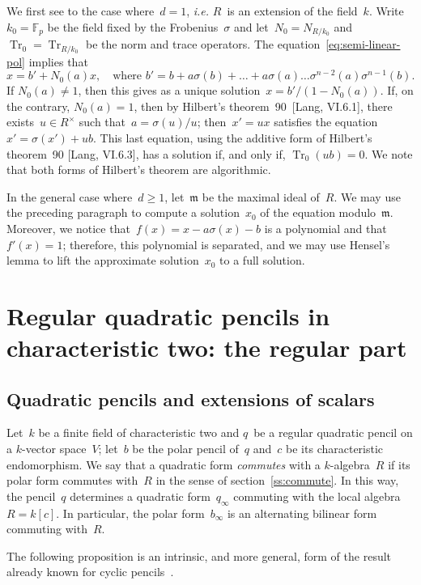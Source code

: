 \documentclass{article}%
\let\fr\mathfrak
\DeclareMathOperator\Tr{Tr}
\def\F{\mathbb{F}}
\begin{document}
We first see to the case where~$d = 1$, \emph{i.e.} $R$~is an extension
of the field~$k$. Write~$k_0 = \F_p$ be the field fixed by the
Frobenius~$σ$ and let~$N_0 = N_{R/k_0}$ and~$\Tr_0 = \Tr_{R/k_0}$ be the
norm and trace operators. The equation~\eqref{eq:semi-linear-pol} implies
that
\begin{equation}
x = b' + N_0(a) x, \quad\text{where $b' = b + a σ(b) + … + a σ(a) …
σ^{n-2}(a) σ^{n-1}(b)$.}
\end{equation}
If $N_0(a) ≠ 1$, then this gives as a unique solution~$x =
b'/(1-N_0(a))$. If, on the contrary, $N_0(a) = 1$, then by
Hilbert's theorem~90~[Lang, VI.6.1], there exists~$u ∈ R^{×}$ such
that~$a = σ(u)/u$; then~$x' = ux$ satisfies the equation~$x' = σ(x') +
ub$. This last equation, using the additive form of Hilbert's theorem~90
[Lang, VI.6.3], has a solution if, and only if, $\Tr_0 (ub) = 0$. We
note that both forms of Hilbert's theorem are algorithmic.

In the general case where~$d ≥ 1$, let~$\fr m$ be the maximal ideal
of~$R$. We may use the preceding paragraph to compute a solution~$x_0$ of
the equation modulo~$\fr m$. Moreover, we notice that~$f(x) = x -  a σ(x)
- b$ is a polynomial and that~$f'(x) = 1$; therefore, this polynomial is
separated, and we may use Hensel's lemma to lift the approximate
solution~$x_0$ to a full solution.

\section{Regular quadratic pencils in characteristic two: the regular part}%
\label{S:quad-reg}
\subsection{Quadratic pencils and extensions of scalars}%
Let~$k$ be a finite field of characteristic two and $q$~be a regular
quadratic pencil on a $k$-vector space~$V$;
let~$b$ be the polar pencil of~$q$ and~$c$ be its characteristic endomorphism.
We say that a quadratic form \emph{commutes} with a $k$-algebra~$R$ if
its polar form commutes with~$R$ in the sense of
section~\ref{ss:commute}.
In this way, the pencil~$q$ determines a quadratic form~$q_{∞}$
commuting with the local algebra~$R = k[c]$.
In particular, the polar form~$b_{∞}$ is an alternating bilinear form
commuting with~$R$.

The following proposition is an intrinsic, and more general, form
of the result already known for cyclic pencils~\cite[Prop.~5]{MPG2013}.
\end{document}
